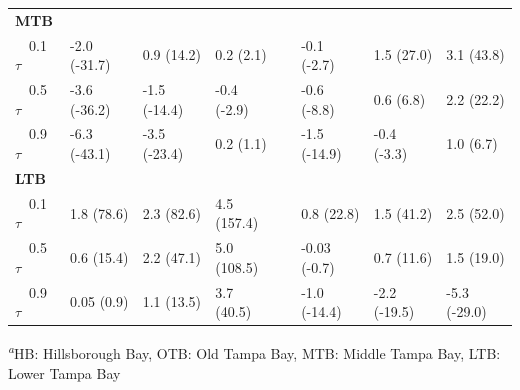 \documentclass{svjour3}\usepackage[]{graphicx}\usepackage[]{color}
\begin{document}
\begin{table}[!tbp]
\begin{center}
\begin{tabular}{llllclll}
\hline
{\bfseries MTB}&&&&&&&\tabularnewline
~~0.1 $\tau$&-2.0 {\footnotesize (-31.7)}&0.9 {\footnotesize (14.2)}&0.2 {\footnotesize (2.1)}&&-0.1 {\footnotesize (-2.7)}&1.5 {\footnotesize (27.0)}&3.1 {\footnotesize (43.8)}\tabularnewline
~~0.5 $\tau$&-3.6 {\footnotesize (-36.2)}&-1.5 {\footnotesize (-14.4)}&-0.4 {\footnotesize (-2.9)}&&-0.6 {\footnotesize (-8.8)}&0.6 {\footnotesize (6.8)}&2.2 {\footnotesize (22.2)}\tabularnewline
~~0.9 $\tau$&-6.3 {\footnotesize (-43.1)}&-3.5 {\footnotesize (-23.4)}&0.2 {\footnotesize (1.1)}&&-1.5 {\footnotesize (-14.9)}&-0.4 {\footnotesize (-3.3)}&1.0 {\footnotesize (6.7)}\tabularnewline
\hline
{\bfseries LTB}&&&&&&&\tabularnewline
~~0.1 $\tau$&1.8 {\footnotesize (78.6)}&2.3 {\footnotesize (82.6)}&4.5 {\footnotesize (157.4)}&&0.8 {\footnotesize (22.8)}&1.5 {\footnotesize (41.2)}&2.5 {\footnotesize (52.0)}\tabularnewline
~~0.5 $\tau$&0.6 {\footnotesize (15.4)}&2.2 {\footnotesize (47.1)}&5.0 {\footnotesize (108.5)}&&-0.03 {\footnotesize (-0.7)}&0.7 {\footnotesize (11.6)}&1.5 {\footnotesize (19.0)}\tabularnewline
~~0.9 $\tau$&0.05 {\footnotesize (0.9)}&1.1 {\footnotesize (13.5)}&3.7 {\footnotesize (40.5)}&&-1.0 {\footnotesize (-14.4)}&-2.2 {\footnotesize (-19.5)}&-5.3 {\footnotesize (-29.0)}\tabularnewline
\hline
\end{tabular}\end{center}

\footnotesize \textsuperscript{\textit{a}}HB: Hillsborough Bay, OTB: Old Tampa Bay, MTB: Middle Tampa Bay, LTB: Lower Tampa Bay\end{table}
\end{document}
